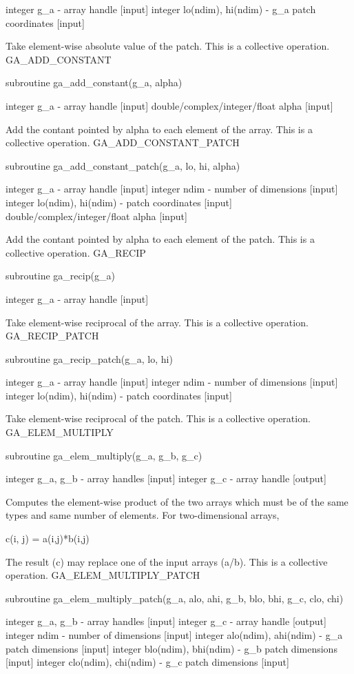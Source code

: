 integer g\_a - array handle {[}input{]} integer lo(ndim), hi(ndim)
- g\_a patch coordinates {[}input{]} 

Take element-wise absolute value of the patch. This is a collective
operation. GA\_ADD\_CONSTANT

subroutine ga\_add\_constant(g\_a, alpha)

integer g\_a - array handle {[}input{]} double/complex/integer/float
alpha {[}input{]}

Add the contant pointed by alpha to each element of the array. This
is a collective operation. GA\_ADD\_CONSTANT\_PATCH

subroutine ga\_add\_constant\_patch(g\_a, lo, hi, alpha)

integer g\_a - array handle {[}input{]} integer ndim - number of dimensions
{[}input{]} integer lo(ndim), hi(ndim) - patch coordinates {[}input{]}
double/complex/integer/float alpha {[}input{]}

Add the contant pointed by alpha to each element of the patch. This
is a collective operation. GA\_RECIP

subroutine ga\_recip(g\_a)

integer g\_a - array handle {[}input{]} 

Take element-wise reciprocal of the array. This is a collective operation.
GA\_RECIP\_PATCH

subroutine ga\_recip\_patch(g\_a, lo, hi)

integer g\_a - array handle {[}input{]} integer ndim - number of dimensions
{[}input{]} integer lo(ndim), hi(ndim) - patch coordinates {[}input{]}

Take element-wise reciprocal of the patch. This is a collective operation.
GA\_ELEM\_MULTIPLY

subroutine ga\_elem\_multiply(g\_a, g\_b, g\_c)

integer g\_a, g\_b - array handles {[}input{]} integer g\_c - array
handle {[}output{]}

Computes the element-wise product of the two arrays which must be
of the same types and same number of elements. For two-dimensional
arrays,

c(i, j) = a(i,j){*}b(i,j)

The result (c) may replace one of the input arrays (a/b). This is
a collective operation. GA\_ELEM\_MULTIPLY\_PATCH

subroutine ga\_elem\_multiply\_patch(g\_a, alo, ahi, g\_b, blo, bhi,
g\_c, clo, chi)

integer g\_a, g\_b - array handles {[}input{]} integer g\_c - array
handle {[}output{]} integer ndim - number of dimensions {[}input{]}
integer alo(ndim), ahi(ndim) - g\_a patch dimensions {[}input{]} integer
blo(ndim), bhi(ndim) - g\_b patch dimensions {[}input{]} integer clo(ndim),
chi(ndim) - g\_c patch dimensions {[}input{]}

